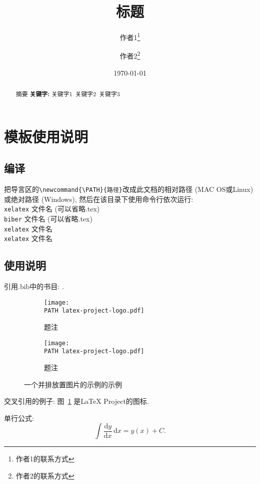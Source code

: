 \documentclass{ctexart}
\title{标题}
\author{ 作者1\thanks{作者1的联系方式}
	\and
		作者2\thanks{作者2的联系方式}}
\date{\today} %
\newcommand{\PATH}{路径/}
\newcommand{\md}{\mathrm{d}} %
\newcommand*{\pdiff}[2]{\frac{\partial #1}{\partial #2}} %
\newcommand*{\diff}[2]{\frac{\mathrm{d} #1}{\mathrm{d} #2}} %
\begin{document}
\maketitle %

\begin{abstract}
	摘要
	\centering %
	\textbf{关键字:}
		关键字1\ 
		关键字2\  
		关键字3
\end{abstract}

\tableofcontents
\newpage

\section{模板使用说明}
\subsection{编译}
把导言区的\verb|\newcommand{\PATH}{路径}|改成此文档的相对路径 (MAC OS或Linux) 或绝对路径 (Windows), 然后在该目录下使用命令行依次运行:\\[1pt]
\texttt{xelatex} 文件名 (可以省略.tex)\\
\texttt{biber} 文件名 (可以省略.tex)\\
\texttt{xelatex} 文件名\\
\texttt{xelatex} 文件名\\

\subsection{使用说明}

引用.bib中的书目: \cite{Knuth}.

\begin{figure}[h] %
\centering
\begin{subfigure}{.5\textwidth}
	\centering
	\texttt{[image: \\PATH latex-project-logo.pdf]}
	\caption{题注}
	\label{子图1}
\end{subfigure}%
\begin{subfigure}{.5\textwidth}
	\centering
	\texttt{[image: \\PATH latex-project-logo.pdf]}
	\caption{题注}
	\label{子图2}
\end{subfigure}
\caption{一个并排放置图片的示例的示例}
\end{figure}

交叉引用的例子: 图~\ref{子图1} 是LaTeX Project的图标.

单行公式:
\begin{equation}\label{公式的标签}
	\int \diff y x\,\md x = y(x) + C.
\end{equation}
\end{document}
